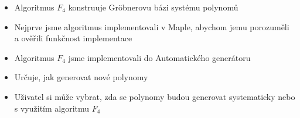 \documentclass[cmpiitalkstyle, 25pt]{cmptalk}
\begin{document}
\begin{cmptalkslide}[Algoritmus $F_4$]
  \begin{itemize}
    \item Algoritmus $F_4$ \cite{F4} konstruuje Gr\"obnerovu bázi systému polynomů
    \item Nejprve jsme algoritmus implementovali v Maple, abychom jemu porozuměli a ověřili funkčnost implementace
    \item Algoritmus $F_4$ jsme implementovali do Automatického generátoru \cite{AutoGen}
    \item Určuje, jak generovat nové polynomy
    \item Uživatel si může vybrat, zda se polynomy budou generovat systematicky nebo s využitím algoritmu $F_4$
  \end{itemize}


\end{cmptalkslide}

\end{document}
